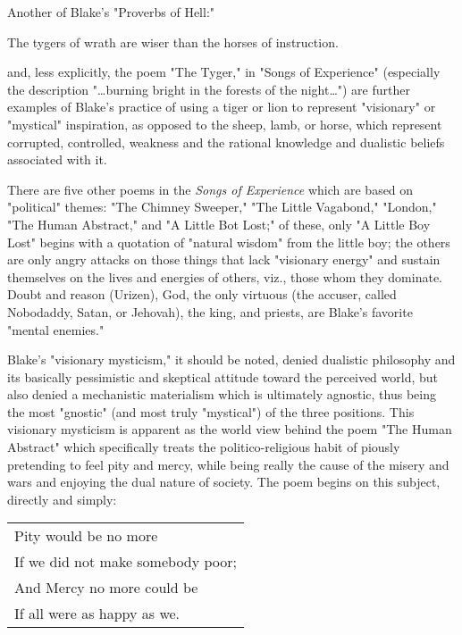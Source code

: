\hspace*{5mm}Another of Blake's "Proverbs of Hell:"\par
\begin{center}
	\parbox{0.8\textwidth}{
		\centering
		The tygers of wrath are wiser than the horses of instruction.
	}%
\end{center}
and, less explicitly, the poem "The Tyger," in "Songs of Experience" (especially the description "\dots burning bright
in the forests of the night\dots") are further examples of Blake's practice of using a tiger or lion to represent "visionary"
or "mystical" inspiration, as opposed to the sheep, lamb, or horse, which represent corrupted, controlled, weakness and the rational
knowledge and dualistic beliefs associated with it.\par
\vspace*{0.5\baselineskip}
There are five other poems in the \textit{Songs of Experience} which are based on "political" themes: "The Chimney Sweeper,"
"The Little Vagabond," "London," "The Human Abstract," and "A Little Bot Lost;" of these, only "A Little Boy Lost" begins with a quotation of "natural wisdom"
from the little boy; the others are only angry attacks on those things that lack "visionary energy" and sustain themselves on the lives and energies of others, viz., 
those whom they dominate. Doubt and reason (Urizen), God, the only virtuous (the accuser, called Nobodaddy, Satan, or Jehovah), the king, and priests, are Blake's favorite "mental enemies."\par
\vspace*{0.5\baselineskip}
Blake's "visionary mysticism," it should be noted, denied dualistic philosophy and its basically pessimistic and skeptical attitude toward
the perceived world, but also denied a mechanistic materialism which is ultimately agnostic, thus being the most "gnostic" (and most truly "mystical") of 
the three positions. This visionary mysticism is apparent as the world view behind the poem "The Human Abstract" which specifically treats the politico-religious habit of piously
pretending to feel pity and mercy, while being really the cause of the misery and wars and enjoying the dual nature of society. The poem begins on this subject, directly and simply:\par
\begin{center}
	\begin{tabular}{l}
		Pity would be no more             \\
		If we did not make somebody poor; \\
		And Mercy no more could be        \\
		If all were as happy as we.
	\end{tabular}
\end{center}

